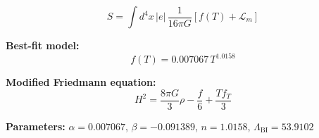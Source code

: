 
\begin{equation}
  S = \int d^4x \, |e| \, \frac{1}{16\pi G} \left[ f(T) + \mathcal{L}_m \right]
\end{equation}

\textbf{Best-fit model:}
\begin{equation}
  f(T) = 0.007067 \, T^{1.0158}
\end{equation}

\textbf{Modified Friedmann equation:}
\begin{equation}
  H^2 = \frac{8\pi G}{3} \rho - \frac{f}{6} + \frac{T f_T}{3}
\end{equation}

\textbf{Parameters:}
$\alpha = 0.007067$, \quad
$\beta = -0.091389$, \quad
$n = 1.0158$, \quad
$\Lambda_{\text{BI}} = 53.9102$